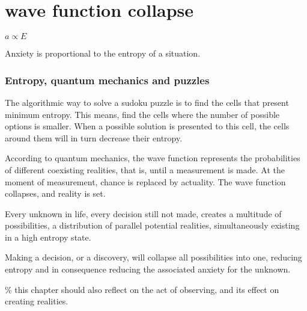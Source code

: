 \chapter*{wave function collapse}
\begin{center}
\vspace{2cm}
\begin{flushright}
\large
\textit{ $a \propto E$ }
\end{flushright}
\vspace{2cm}
\end{center}
\normalsize

Anxiety is proportional to the entropy of a situation. 

\subsection*{ Entropy, quantum mechanics and puzzles} 

The algorithmic way to solve a sudoku puzzle is to find the cells 
that present minimum entropy. 
This means, find the cells where the number of possible options is smaller.
When a possible solution is presented to this cell, the cells around them will 
in turn decrease their entropy. 

According to quantum mechanics, the wave function represents the probabilities 
of different coexisting realities, that is, until a 
measurement is made. At the moment of measurement, chance is replaced by 
actuality. The wave function collapses, and reality is set.

Every unknown in life, every decision still not made, creates a multitude of 
possibilities, a distribution of parallel potential realities, simultaneously 
existing in a high entropy state. 

Making a decision, or a discovery, will collapse all possibilities into one, 
reducing entropy and in consequence reducing the associated anxiety for the unknown. 

{\scriptsize \textcolor{comment}{\%  this chapter should also reflect on the act of observing, and its effect on creating realities. }}




